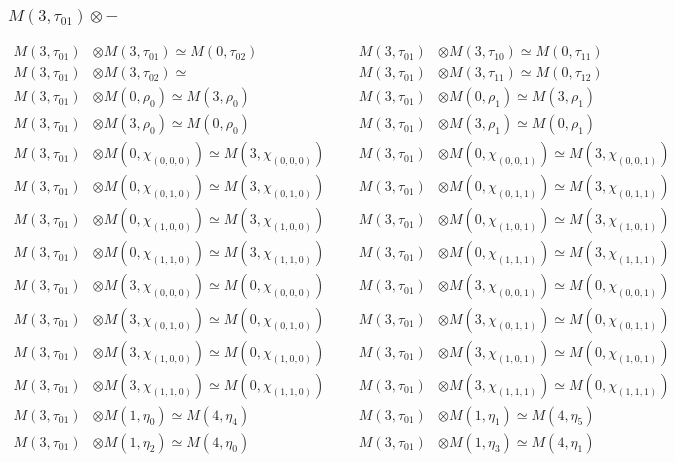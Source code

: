 \subsubsection{$ M(3,\tau_{01})\otimes -$}
\begin{align*}
M(3,\tau_{01}) &\otimes M(3,\tau_{01}) \simeq M(0,\tau_{02}) &&& M(3,\tau_{01}) &\otimes M(3,\tau_{10}) \simeq M(0,\tau_{11})\\
M(3,\tau_{01}) &\otimes M(3,\tau_{02}) \simeq  &&& M(3,\tau_{01}) &\otimes M(3,\tau_{11}) \simeq M(0,\tau_{12})\\
M(3,\tau_{01}) &\otimes M(0,\rho_{0}) \simeq M(3,\rho_{0}) &&& M(3,\tau_{01}) &\otimes M(0,\rho_{1}) \simeq M(3,\rho_{1})\\
M(3,\tau_{01}) &\otimes M(3,\rho_{0}) \simeq M(0,\rho_{0}) &&& M(3,\tau_{01}) &\otimes M(3,\rho_{1}) \simeq M(0,\rho_{1})\\
M(3,\tau_{01}) &\otimes M(0,\chi_{(0,0,0)}) \simeq M(3,\chi_{(0,0,0)}) &&& M(3,\tau_{01}) &\otimes M(0,\chi_{(0,0,1)}) \simeq M(3,\chi_{(0,0,1)})\\
M(3,\tau_{01}) &\otimes M(0,\chi_{(0,1,0)}) \simeq M(3,\chi_{(0,1,0)}) &&& M(3,\tau_{01}) &\otimes M(0,\chi_{(0,1,1)}) \simeq M(3,\chi_{(0,1,1)})\\
M(3,\tau_{01}) &\otimes M(0,\chi_{(1,0,0)}) \simeq M(3,\chi_{(1,0,0)}) &&& M(3,\tau_{01}) &\otimes M(0,\chi_{(1,0,1)}) \simeq M(3,\chi_{(1,0,1)})\\
M(3,\tau_{01}) &\otimes M(0,\chi_{(1,1,0)}) \simeq M(3,\chi_{(1,1,0)}) &&& M(3,\tau_{01}) &\otimes M(0,\chi_{(1,1,1)}) \simeq M(3,\chi_{(1,1,1)})\\
M(3,\tau_{01}) &\otimes M(3,\chi_{(0,0,0)}) \simeq M(0,\chi_{(0,0,0)}) &&& M(3,\tau_{01}) &\otimes M(3,\chi_{(0,0,1)}) \simeq M(0,\chi_{(0,0,1)})\\
M(3,\tau_{01}) &\otimes M(3,\chi_{(0,1,0)}) \simeq M(0,\chi_{(0,1,0)}) &&& M(3,\tau_{01}) &\otimes M(3,\chi_{(0,1,1)}) \simeq M(0,\chi_{(0,1,1)})\\
M(3,\tau_{01}) &\otimes M(3,\chi_{(1,0,0)}) \simeq M(0,\chi_{(1,0,0)}) &&& M(3,\tau_{01}) &\otimes M(3,\chi_{(1,0,1)}) \simeq M(0,\chi_{(1,0,1)})\\
M(3,\tau_{01}) &\otimes M(3,\chi_{(1,1,0)}) \simeq M(0,\chi_{(1,1,0)}) &&& M(3,\tau_{01}) &\otimes M(3,\chi_{(1,1,1)}) \simeq M(0,\chi_{(1,1,1)})\\
M(3,\tau_{01}) &\otimes M(1,\eta_{0}) \simeq M(4,\eta_{4}) &&& M(3,\tau_{01}) &\otimes M(1,\eta_{1}) \simeq M(4,\eta_{5})\\
M(3,\tau_{01}) &\otimes M(1,\eta_{2}) \simeq M(4,\eta_{0}) &&& M(3,\tau_{01}) &\otimes M(1,\eta_{3}) \simeq M(4,\eta_{1})\\

\end{align*}
